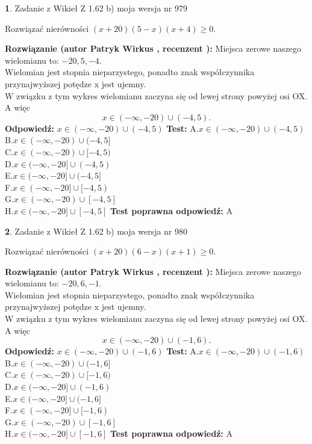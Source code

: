 \documentclass[12pt, a4paper]{article}
\theoremstyle{definition} %
\newtheorem{zad}{}
\newcommand{\zadStart}[1]{\begin{zad}#1\newline}
\newcommand{\zadStop}{\end{zad}}
\newcommand{\rozwStart}[2]{\noindent \textbf{Rozwiązanie (autor #1 , recenzent #2): }\newline}
\newcommand{\rozwStop}{\newline}
\newcommand{\odpStart}{\noindent \textbf{Odpowiedź:}\newline}
\newcommand{\odpStop}{\newline}
\newcommand{\testStart}{\noindent \textbf{Test:}\newline}
\newcommand{\testStop}{\newline}
\newcommand{\kluczStart}{\noindent \textbf{Test poprawna odpowiedź:}\newline}
\newcommand{\kluczStop}{\newline}
\begin{document}
\zadStart{Zadanie z Wikieł Z 1.62 b) moja wersja nr 979}

Rozwiązać nierówności $(x+20)(5-x)(x+4)\ge0$.
\zadStop
\rozwStart{Patryk Wirkus}{}
Miejsca zerowe naszego wielomianu to: $-20, 5, -4$.\\
Wielomian jest stopnia nieparzystego, ponadto znak współczynnika przy\linebreak najwyższej potędze x jest ujemny.\\ W związku z tym wykres wielomianu zaczyna się od lewej strony powyżej osi OX. A więc $$x \in (-\infty,-20) \cup (-4,5).$$
\rozwStop
\odpStart
$x \in (-\infty,-20) \cup (-4,5)$
\odpStop
\testStart
A.$x \in (-\infty,-20) \cup (-4,5)$\\
B.$x \in (-\infty,-20) \cup (-4,5]$\\
C.$x \in (-\infty,-20) \cup [-4,5)$\\
D.$x \in (-\infty,-20] \cup (-4,5)$\\
E.$x \in (-\infty,-20] \cup (-4,5]$\\
F.$x \in (-\infty,-20] \cup [-4,5)$\\
G.$x \in (-\infty,-20) \cup [-4,5]$\\
H.$x \in (-\infty,-20] \cup [-4,5]$
\testStop
\kluczStart
A
\kluczStop



\zadStart{Zadanie z Wikieł Z 1.62 b) moja wersja nr 980}

Rozwiązać nierówności $(x+20)(6-x)(x+1)\ge0$.
\zadStop
\rozwStart{Patryk Wirkus}{}
Miejsca zerowe naszego wielomianu to: $-20, 6, -1$.\\
Wielomian jest stopnia nieparzystego, ponadto znak współczynnika przy\linebreak najwyższej potędze x jest ujemny.\\ W związku z tym wykres wielomianu zaczyna się od lewej strony powyżej osi OX. A więc $$x \in (-\infty,-20) \cup (-1,6).$$
\rozwStop
\odpStart
$x \in (-\infty,-20) \cup (-1,6)$
\odpStop
\testStart
A.$x \in (-\infty,-20) \cup (-1,6)$\\
B.$x \in (-\infty,-20) \cup (-1,6]$\\
C.$x \in (-\infty,-20) \cup [-1,6)$\\
D.$x \in (-\infty,-20] \cup (-1,6)$\\
E.$x \in (-\infty,-20] \cup (-1,6]$\\
F.$x \in (-\infty,-20] \cup [-1,6)$\\
G.$x \in (-\infty,-20) \cup [-1,6]$\\
H.$x \in (-\infty,-20] \cup [-1,6]$
\testStop
\kluczStart
A
\kluczStop
\end{document}

